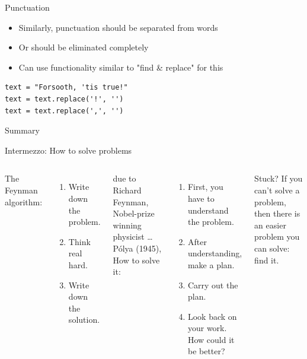 \documentclass[aspectratio=169,usenames,dvipsnames]{beamer}
\begin{document}
\begin{frame}[fragile]{Punctuation}
    \begin{itemize}
        \item Similarly, punctuation should be separated from words
        \item Or should be eliminated completely
        \item Can use functionality similar to "find \& replace" for this
    \end{itemize}
    \pause
\begin{lstlisting}
text = "Forsooth, 'tis true!"
text = text.replace('!', '')
text = text.replace(',', '')
\end{lstlisting}
\end{frame}


\begin{frame}{Summary}
\end{frame}





\begin{frame}{Intermezzo: How to solve problems}
	\begin{columns}
			The Feynman algorithm:
			\begin{enumerate}
				\item Write down the problem.
				\item Think real hard.
				\item Write down the solution.
			\end{enumerate}

			\vspace{1em}
			due to Richard Feynman, Nobel-prize winning physicist \dots
		\pause
			Pólya (1945), How to solve it:

			\begin{enumerate}
				\item First, you have to understand the problem.
				\item After understanding, make a plan.
				\item Carry out the plan.
				\item Look back on your work. How could it be better?
			\end{enumerate}

			\begin{block}{Stuck?}
			If you can't solve a problem,
			then there is an easier problem you can solve:
			find it.
			\end{block}
	\end{columns}
\end{frame}
\end{document}
